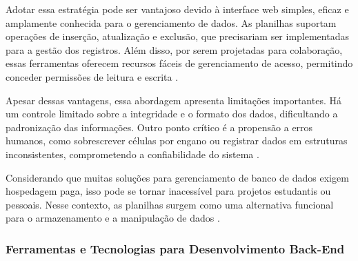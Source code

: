 Adotar essa estratégia pode ser vantajoso devido à interface web simples, eficaz e amplamente conhecida para o gerenciamento de dados. As planilhas suportam operações de inserção, atualização e exclusão, que precisariam ser implementadas para a gestão dos registros. Além disso, por serem projetadas para colaboração, essas ferramentas oferecem recursos fáceis de gerenciamento de acesso, permitindo conceder permissões de leitura e escrita \cite{schwertnercharao:hal-02119998}.

Apesar dessas vantagens, essa abordagem apresenta limitações importantes. Há um controle limitado sobre a integridade e o formato dos dados, dificultando a padronização das informações. Outro ponto crítico é a propensão a erros humanos, como sobrescrever células por engano ou registrar dados em estruturas inconsistentes, comprometendo a confiabilidade do sistema \cite{wisconsin2020}.

Considerando que muitas soluções para gerenciamento de banco de dados exigem hospedagem paga, isso pode se tornar inacessível para projetos estudantis ou pessoais. Nesse contexto, as planilhas surgem como uma alternativa funcional para o armazenamento e a manipulação de dados \cite{ufsm2024}.

\subsubsection{Ferramentas e Tecnologias para Desenvolvimento Back-End}

